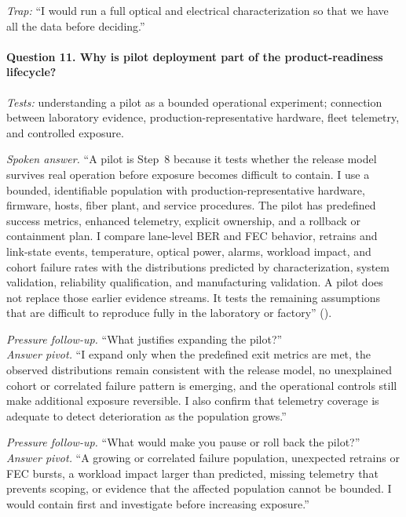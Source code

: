 \textit{Trap:} ``I would run a full optical and electrical characterization so
that we have all the data before deciding.''

\paragraph{Question 11. Why is pilot deployment part of the product-readiness
lifecycle?}
\textit{Tests:} understanding a pilot as a bounded operational experiment;
connection between laboratory evidence, production-representative hardware,
fleet telemetry, and controlled exposure.

\textit{Spoken answer.}
``A pilot is Step~8 because it tests whether the release model survives real
operation before exposure becomes difficult to contain. I use a bounded,
identifiable population with production-representative hardware, firmware,
hosts, fiber plant, and service procedures. The pilot has predefined success
metrics, enhanced telemetry, explicit ownership, and a rollback or containment
plan. I compare lane-level BER and FEC behavior, retrains and link-state events,
temperature, optical power, alarms, workload impact, and cohort failure rates
with the distributions predicted by characterization, system validation,
reliability qualification, and manufacturing validation. A pilot does not
replace those earlier evidence streams. It tests the remaining assumptions that
are difficult to reproduce fully in the laboratory or factory''
().

\textit{Pressure follow-up.} ``What justifies expanding the pilot?''\\
\textit{Answer pivot.} ``I expand only when the predefined exit metrics are met,
the observed distributions remain consistent with the release model, no
unexplained cohort or correlated failure pattern is emerging, and the
operational controls still make additional exposure reversible. I also confirm
that telemetry coverage is adequate to detect deterioration as the population
grows.''

\textit{Pressure follow-up.} ``What would make you pause or roll back the
pilot?''\\
\textit{Answer pivot.} ``A growing or correlated failure population, unexpected
retrains or FEC bursts, a workload impact larger than predicted, missing
telemetry that prevents scoping, or evidence that the affected population cannot
be bounded. I would contain first and investigate before increasing exposure.''

